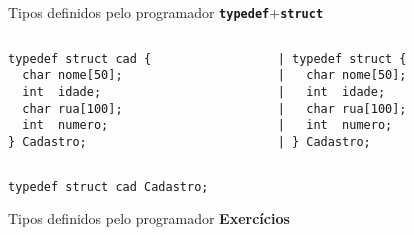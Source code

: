 \documentclass[10pt]{beamer}
\begin{document}
\begin{frame}[fragile]{Tipos definidos pelo programador}
    \huge \textbf{\texttt{typedef}$+$\texttt{struct}}
    
    \bigskip
    
    \large
    \begin{columns}
    \begin{column}{0.40\textwidth}
        \begin{verbatim}
typedef struct cad {
  char nome[50];
  int  idade;
  char rua[100];
  int  numero;
} Cadastro;
        \end{verbatim}
    \end{column}
    \begin{column}{0.50\textwidth}
        \begin{verbatim}
| typedef struct {
|   char nome[50];
|   int  idade;
|   char rua[100];
|   int  numero;
| } Cadastro;
        \end{verbatim}
    \end{column}
    \end{columns}
    
    \begin{verbatim}
typedef struct cad Cadastro;
    \end{verbatim}
\end{frame}

\begin{frame}[fragile]{Tipos definidos pelo programador}
    \huge \textbf{Exercícios}
\end{frame}
\end{document}
